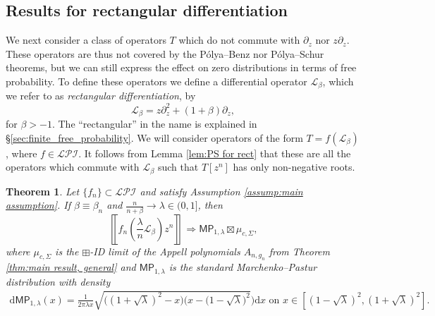 \documentclass[reqno]{amsart}
\newcommand{\1}{\mathbf{1}}
\newcommand{\dd}{\mathrm{d}}
\theoremstyle{plain}
\newtheorem{theorem}{Theorem}[section]
\theoremstyle{definition}
\theoremstyle{remark}
\numberwithin{equation}{section}
\begin{document}
\subsection{Results for rectangular differentiation}  We next consider a class of operators $T$ which do not commute with $\partial_{z}$ nor $z\partial_{z}$. These operators are thus not covered by the P\'olya--Benz nor P\'olya--Schur theorems, but we can still express the effect on zero distributions in terms of free probability. To define these operators we define a differential operator $\mathscr{L}_{\beta}$, which we refer to as \emph{rectangular differentiation}, by 
\begin{equation}\label{eq:M def}
	\mathscr{L}_{\beta}=z\partial_{z}^2+(1+\beta)\partial_{z},
\end{equation} for $\beta>-1$. The ``rectangular'' in the name is explained in \S \ref{sec:finite_free_probability}. We will consider operators of the form $T=f(\mathscr{L}_{\beta})$, where $f\in\mathcal{LPI}$. It follows from Lemma \ref{lem:PS for rect}  that these are all the operators which commute with $\mathscr{L}_{\beta}$ such that $T[z^n]$ has only non-negative roots. 
\begin{theorem}\label{thm:rectangular Appell polynomials}
	Let $\{f_{n}\}\subset\mathcal{LPI}$ and satisfy Assumption \ref{assump:main assumption}. If $\beta\equiv\beta_n$ and $\frac{n}{n+\beta}\rightarrow \lambda\in (0,1]$, then \begin{equation}
		\left\llbracket f_n\left(\frac{\lambda}{n}\mathscr{L}_\beta\right)z^{n}\right\rrbracket\Rightarrow\mathsf{MP}_{1,\lambda}\boxtimes \mu_{c,\Sigma},
	\end{equation} 
	 where $\mu_{c,\Sigma}$ is the $\boxplus$-ID limit of the Appell polynomials $A_{n,g_n}$ from Theorem \ref{thm:main result, general} and $\mathsf{MP}_{1,\lambda}$ is the standard Marchenko--Pastur distribution with density 
	\begin{align*}
		\dd\mathsf{MP}_{1,\lambda}(x)
		=\frac 1 {2\pi\lambda x} \sqrt{\big((1+\sqrt{\lambda})^2-x\big) \big(x-(1-\sqrt{\lambda}\big)^2  }\big)\dd x \text{ on } x\in[(1-\sqrt{\lambda})^2, (1+\sqrt{\lambda})^2].
	\end{align*}
\end{theorem} 
\end{document}
